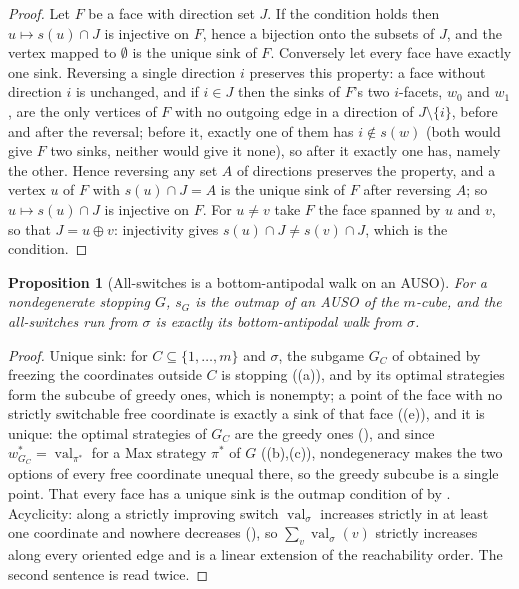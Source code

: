 \documentclass[11pt]{article}
\theoremstyle{plain}
\newtheorem{proposition}[theorem]{Proposition}
\theoremstyle{definition}
\DeclareMathOperator{\val}{val}
\begin{document}
\begin{proof}
Let $F$ be a face with direction set $J$. If the condition holds then
$u\mapsto s(u)\cap J$ is injective on $F$, hence a bijection onto the
subsets of $J$, and the vertex mapped to $\emptyset$ is the unique sink of
$F$. Conversely let every face have exactly one sink. Reversing a single
direction $i$ preserves this property: a face without direction $i$ is
unchanged, and if $i\in J$ then the sinks of $F$'s two $i$-facets, $w_0$
and $w_1$, are the only vertices of $F$ with no outgoing edge in a
direction of $J\setminus\{i\}$, before and after the reversal; before it,
exactly one of them has $i\notin s(w)$ (both would give $F$ two sinks,
neither would give it none), so after it exactly one has, namely the
other. Hence reversing any set $A$ of directions preserves the property,
and a vertex $u$ of $F$ with $s(u)\cap J=A$ is the unique sink of $F$ after
reversing $A$; so $u\mapsto s(u)\cap J$ is injective on $F$. For $u\ne v$
take $F$ the face spanned by $u$ and $v$, so that $J=u\oplus v$:
injectivity gives $s(u)\cap J\ne s(v)\cap J$, which is the condition.
\end{proof}

\begin{proposition}[All-switches is a bottom-antipodal walk on an AUSO]\label{prop:allsw-auso}
For a nondegenerate stopping $G$, $s_G$ is the outmap of an AUSO of the
$m$-cube, and the all-switches run from $\sigma$ is exactly its
bottom-antipodal walk from $\sigma$.
\end{proposition}

\begin{proof}
Unique sink: for $C\subseteq\{1,\dots,m\}$ and $\sigma$, the subgame
$G_C$ of  obtained by freezing the coordinates outside $C$ is
stopping ((a)), and by  its optimal
strategies form the subcube of greedy ones, which is nonempty; a point of the
face with no strictly switchable free coordinate is exactly a sink of that face
((e)), and it is unique: the optimal strategies of $G_C$
are the greedy ones (), and since
$w^\ast_{G_C}=\val_{\pi^\ast}$ for a Max strategy $\pi^\ast$ of $G$
((b),(c)), nondegeneracy makes the two options of every
free coordinate unequal there, so the greedy subcube is a single point.
That every face has a unique sink is the outmap condition of
 by . Acyclicity:
along a strictly improving switch $\val_\sigma$ increases strictly in at least
one coordinate and nowhere decreases (), so
$\sum_v\val_\sigma(v)$ strictly increases along every oriented edge and is a
linear extension of the reachability order. The second sentence is
 read twice.
\end{proof}
\end{document}
